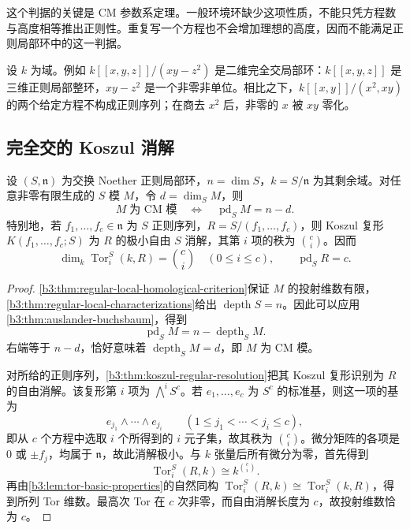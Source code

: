 这个判据的关键是 CM 参数系定理。一般环境环缺少这项性质，不能只凭方程数与高度相等推出正则性。重复写一个方程也不会增加理想的高度，因而不能满足正则局部环中的这一判据。

\ProseParagraphBreak
设 \(k\) 为域。例如 \(k[\![x,y,z]\!]/(xy-z^2)\) 是二维完全交局部环：\(k[\![x,y,z]\!]\) 是三维正则局部整环，\(xy-z^2\) 是一个非零非单位。相比之下，\(k[\![x,y]\!]/(x^2,xy)\) 的两个给定方程不构成正则序列；在商去 \(x^2\) 后，非零的 \(x\) 被 \(xy\) 零化。

\subsection{完全交的 Koszul 消解}
\label{b3:subsec:1903:02}

\begin{proposition}\label{b3:prop:ci-koszul-resolution}\label{b3:prop:cm-pd-codimension}
	设 \((S,\mathfrak n)\) 为交换 Noether 正则局部环，\(n=\dim S\)，\(k=S/\mathfrak n\) 为其剩余域。对任意非零有限生成的 \(S\) 模 \(M\)，令 \(d=\dim_SM\)，则
	\[
		M\;\text{为 CM 模}\quad\Longleftrightarrow\quad \operatorname{pd}_SM=n-d.
	\]
	特别地，若 \(f_1,\ldots,f_c\in\mathfrak n\) 为 \(S\) 正则序列，\(R=S/(f_1,\ldots,f_c)\)，则 Koszul 复形 \(K(f_1,\ldots,f_c;S)\) 为 \(R\) 的极小自由 \(S\) 消解，其第 \(i\) 项的秩为 \(\binom ci\)。因而
	\[
		\dim_k\operatorname{Tor}_i^S(k,R)=\binom ci\quad(0\le i\le c), \qquad\operatorname{pd}_S R=c.
	\]
\end{proposition}
\begin{proof}
	\cref{b3:thm:regular-local-homological-criterion}保证 \(M\) 的投射维数有限，\cref{b3:thm:regular-local-characterizations}给出 \(\operatorname{depth}S=n\)。因此可以应用\cref{b3:thm:auslander-buchsbaum}，得到
	\[
		\operatorname{pd}_SM=n-\operatorname{depth}_SM.
	\]
	右端等于 \(n-d\)，恰好意味着 \(\operatorname{depth}_SM=d\)，即 \(M\) 为 CM 模。

	对所给的正则序列，\cref{b3:thm:koszul-regular-resolution}把其 Koszul 复形识别为 \(R\) 的自由消解。该复形第 \(i\) 项为 \(\bigwedge^iS^c\)。若 \(e_1,\ldots,e_c\) 为 \(S^c\) 的标准基，则这一项的基为
	\[
		e_{j_1}\wedge\cdots\wedge e_{j_i} \qquad(1\le j_1<\cdots<j_i\le c),
	\]
	即从 \(c\) 个方程中选取 \(i\) 个所得到的 \(i\) 元子集，故其秩为 \(\binom ci\)。微分矩阵的各项是 \(0\) 或 \(\pm f_j\)，均属于 \(\mathfrak n\)，故此消解极小。与 \(k\) 张量后所有微分为零，首先得到
	\[
		\operatorname{Tor}_i^S(R,k)\cong k^{\binom ci}.
	\]
	再由\cref{b3:lem:tor-basic-properties}的自然同构 \(\operatorname{Tor}_i^S(R,k)\cong\operatorname{Tor}_i^S(k,R)\)，得到所列 Tor 维数。最高次 Tor 在 \(c\) 次非零，而自由消解长度为 \(c\)，故投射维数恰为 \(c\)。
\end{proof}


